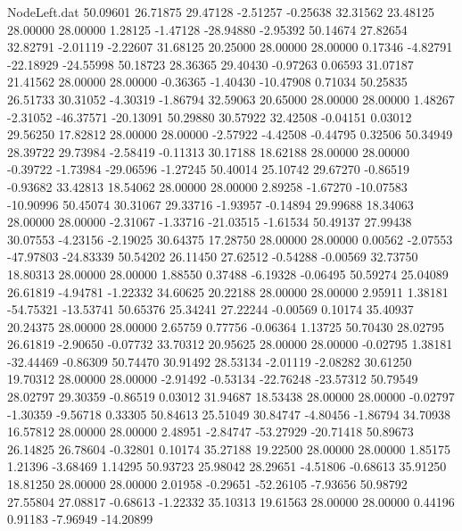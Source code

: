 \begin{filecontents}{NodeLeft.dat}
  50.09601   26.71875   29.47128    -2.51257   -0.25638   32.31562   23.48125   28.00000   28.00000    1.28125   -1.47128  -28.94880   -2.95392
  50.14674   27.82654   32.82791    -2.01119   -2.22607   31.68125   20.25000   28.00000   28.00000    0.17346   -4.82791  -22.18929  -24.55998
  50.18723   28.36365   29.40430    -0.97263    0.06593   31.07187   21.41562   28.00000   28.00000   -0.36365   -1.40430  -10.47908    0.71034
  50.25835   26.51733   30.31052    -4.30319   -1.86794   32.59063   20.65000   28.00000   28.00000    1.48267   -2.31052  -46.37571  -20.13091
  50.29880   30.57922   32.42508    -0.04151    0.03012   29.56250   17.82812   28.00000   28.00000   -2.57922   -4.42508   -0.44795    0.32506
  50.34949   28.39722   29.73984    -2.58419   -0.11313   30.17188   18.62188   28.00000   28.00000   -0.39722   -1.73984  -29.06596   -1.27245
  50.40014   25.10742   29.67270    -0.86519   -0.93682   33.42813   18.54062   28.00000   28.00000    2.89258   -1.67270  -10.07583  -10.90996
  50.45074   30.31067   29.33716    -1.93957   -0.14894   29.99688   18.34063   28.00000   28.00000   -2.31067   -1.33716  -21.03515   -1.61534
  50.49137   27.99438   30.07553    -4.23156   -2.19025   30.64375   17.28750   28.00000   28.00000    0.00562   -2.07553  -47.97803  -24.83339
  50.54202   26.11450   27.62512    -0.54288   -0.00569   32.73750   18.80313   28.00000   28.00000    1.88550    0.37488   -6.19328   -0.06495
  50.59274   25.04089   26.61819    -4.94781   -1.22332   34.60625   20.22188   28.00000   28.00000    2.95911    1.38181  -54.75321  -13.53741
  50.65376   25.34241   27.22244    -0.00569    0.10174   35.40937   20.24375   28.00000   28.00000    2.65759    0.77756   -0.06364    1.13725
  50.70430   28.02795   26.61819    -2.90650   -0.07732   33.70312   20.95625   28.00000   28.00000   -0.02795    1.38181  -32.44469   -0.86309
  50.74470   30.91492   28.53134    -2.01119   -2.08282   30.61250   19.70312   28.00000   28.00000   -2.91492   -0.53134  -22.76248  -23.57312
  50.79549   28.02797   29.30359    -0.86519    0.03012   31.94687   18.53438   28.00000   28.00000   -0.02797   -1.30359   -9.56718    0.33305
  50.84613   25.51049   30.84747    -4.80456   -1.86794   34.70938   16.57812   28.00000   28.00000    2.48951   -2.84747  -53.27929  -20.71418
  50.89673   26.14825   26.78604    -0.32801    0.10174   35.27188   19.22500   28.00000   28.00000    1.85175    1.21396   -3.68469    1.14295
  50.93723   25.98042   28.29651    -4.51806   -0.68613   35.91250   18.81250   28.00000   28.00000    2.01958   -0.29651  -52.26105   -7.93656
  50.98792   27.55804   27.08817    -0.68613   -1.22332   35.10313   19.61563   28.00000   28.00000    0.44196    0.91183   -7.96949  -14.20899

\end{filecontents}
